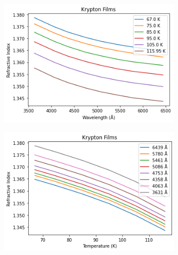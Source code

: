 \documentclass[letterpaper,12pt]{article}
\begin{document}
\begin{figure}[h!]
\begin{subfigure}[b]{0.5\linewidth}
	\end{subfigure}
	\begin{subfigure}[b]{0.5\linewidth}
		\centering
		\includegraphics[width=\textwidth,height=\textheight,keepaspectratio]{krypton1.png}
	\end{subfigure}
	\begin{subfigure}[b]{0.5\linewidth}
		\centering
		\includegraphics[width=\textwidth,height=\textheight,keepaspectratio]{krypton2.png}
	\end{subfigure}
\end{figure}
\end{document}
